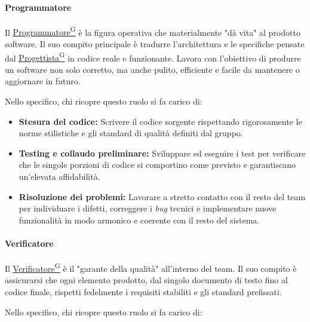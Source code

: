 \documentclass[a4paper,12pt]{article}
\providecommand{\glslink}[2]{\href{https://alittlebyte-19.github.io/Documentazione/glossario.html\#gls-#1}{\underline{#2}\textsuperscript{\scriptsize G}}}
\begin{document}
\paragraph{Programmatore}

Il \glslink{programmatore}{Programmatore} è la figura operativa che materialmente "dà vita" al prodotto software. Il suo compito principale è tradurre l'architettura e le specifiche pensate dal \glslink{progettista}{Progettista} in codice reale e funzionante. Lavora con l'obiettivo di produrre un software non solo corretto, ma anche pulito, efficiente e facile da mantenere o aggiornare in futuro.

Nello specifico, chi ricopre questo ruolo si fa carico di:

\begin{itemize}
    \item \textbf{Stesura del codice:} Scrivere il codice sorgente rispettando rigorosamente le norme stilistiche e gli standard di qualità definiti dal gruppo.
    
    \item \textbf{Testing e collaudo preliminare:} Sviluppare ed eseguire i test per verificare che le singole porzioni di codice si comportino come previsto e garantiscano un'elevata affidabilità.
    
    \item \textbf{Risoluzione dei problemi:} Lavorare a stretto contatto con il resto del team per individuare i difetti, correggere i \textit{bug} tecnici e implementare nuove funzionalità in modo armonico e coerente con il resto del sistema.
\end{itemize}

\paragraph{Verificatore}

Il \glslink{verificatore}{Verificatore} è il "garante della qualità" all'interno del team. Il suo compito è assicurarsi che ogni elemento prodotto, dal singolo documento di testo fino al codice finale, rispetti fedelmente i requisiti stabiliti e gli standard prefissati.

Nello specifico, chi ricopre questo ruolo si fa carico di:
\end{document}
